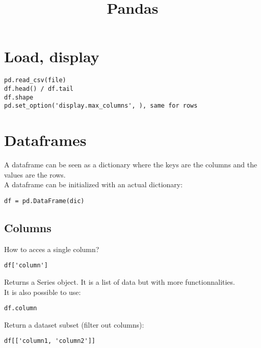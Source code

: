 \documentclass[french]{article}
\title{Pandas}
\begin{document}
\date{}

\maketitle

\setlength{\parindent}{0cm}

\section{Load, display}

\begin{verbatim}
pd.read_csv(file)
df.head() / df.tail
df.shape
pd.set_option('display.max_columns', ), same for rows
\end{verbatim}

\section{Dataframes}

A dataframe can be seen as a dictionary where the keys are the columns and the values are the rows.\\
A dataframe can be initialized with an actual dictionary:
\begin{verbatim}
df = pd.DataFrame(dic)
\end{verbatim}

\subsection{Columns}

How to acces a single column?
\begin{verbatim}
df['column']
\end{verbatim}
Returns a Series object. It is a list of data but with more functionnalities.\\
It is also possible to use:
\begin{verbatim}
df.column
\end{verbatim}
Return a dataset subset (filter out columns):
\begin{verbatim}
df[['column1, 'column2']]
\end{verbatim}
\end{document}
